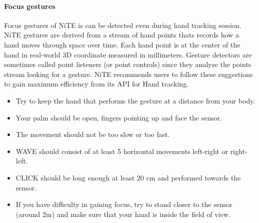 \paragraph*{Focus gestures} Focus gestures of NiTE is can be detected even during hand tracking session. NiTE gestures are derived from a stream of hand points thats records how a hand moves through space over time. Each hand point is at the center of the hand in real-world 3D coordinate measured in millimeters. Gesture detectors are sometimes called point listeners (or point controls) since they analyze the points stream looking for a gesture. NiTE recommends users to follow these suggestions to gain maximum efficiency from its API for Hand tracking.
\begin{itemize}
	\item Try to keep the hand that performs the gesture at a distance from your body. 
	\item Your palm should be open, fingers pointing up and face the sensor. 
	\item The movement should not be too slow or too fast. 
	\item WAVE should consist of at least 5 horizontal movements left-right or right-left. 
	\item CLICK should be long enough at least 20 cm and performed towards the sensor. 
	\item If you have difficulty in gaining focus, try to stand closer to the sensor (around 2m) and make sure that your hand is inside the field of view. 
\end{itemize}
